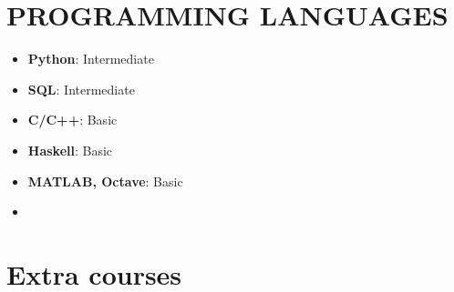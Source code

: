 \documentclass[11 pt,oneside,a4paper,titlepage]{article}
\begin{document}
{\begin{minipage}{11.3cm}
    
    \section*{{\faCode} PROGRAMMING LANGUAGES}
    \vspace*{-0.5cm}
    \begin{multicols}{2}    
    \begin{itemize}
    \footnotesize
        \item \textbf{Python}: Intermediate
        \item \textbf{SQL}: Intermediate
        \item \textbf{C/C++}: Basic
        \item \textbf{Haskell}: Basic
        \item \textbf{MATLAB, Octave}: Basic
        \item[\vspace{\fill}]
    \end{itemize}
    \end{multicols}
    
    \section*{{\faCertificate} Extra courses}
    

\end{minipage}}
\end{document}
